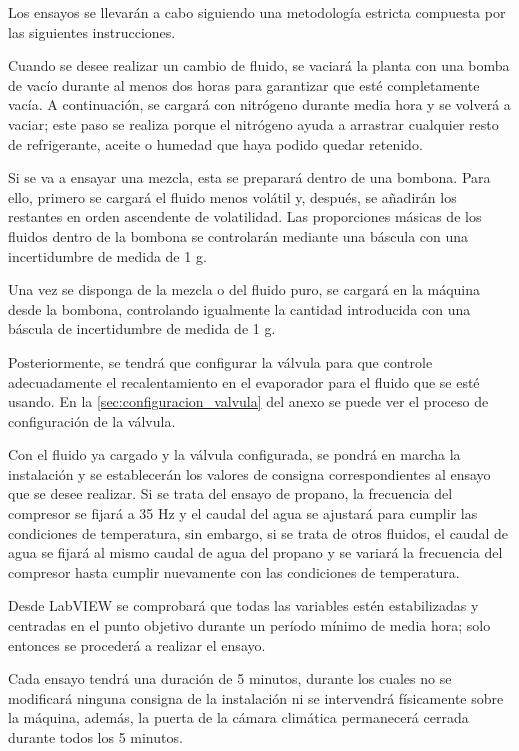 \documentclass[../main.tex]{subfiles}
\begin{document}
Los ensayos se llevarán a cabo siguiendo una metodología estricta compuesta por las siguientes instrucciones.

Cuando se desee realizar un cambio de fluido, se vaciará la planta con una bomba de vacío durante al menos dos horas para garantizar que esté completamente vacía. A continuación, se cargará con nitrógeno durante media hora y se volverá a vaciar; este paso se realiza porque el nitrógeno ayuda a arrastrar cualquier resto de refrigerante, aceite o humedad que haya podido quedar retenido.

Si se va a ensayar una mezcla, esta se preparará dentro de una bombona. Para ello, primero se cargará el fluido menos volátil y, después, se añadirán los restantes en orden ascendente de volatilidad. Las proporciones másicas de los fluidos dentro de la bombona se controlarán mediante una báscula con una incertidumbre de medida de 1 g.

Una vez se disponga de la mezcla o del fluido puro, se cargará en la máquina desde la bombona, controlando igualmente la cantidad introducida con una báscula de incertidumbre de medida de 1 g.

Posteriormente, se tendrá que configurar la válvula para que controle adecuadamente el recalentamiento en el evaporador para el fluido que se esté usando. En la \autoref{sec:configuracion_valvula} del anexo se puede ver el proceso de configuración de la válvula.

Con el fluido ya cargado y la válvula configurada, se pondrá en marcha la instalación y se establecerán los valores de consigna correspondientes al ensayo que se desee realizar. Si se trata del ensayo de propano, la frecuencia del compresor se fijará a 35 Hz y el caudal del agua se ajustará para cumplir las condiciones de temperatura, sin embargo, si se trata de otros fluidos, el caudal de agua se fijará al mismo caudal de agua del propano y se variará la frecuencia del compresor hasta cumplir nuevamente con las condiciones de temperatura.

Desde LabVIEW se comprobará que todas las variables estén estabilizadas y centradas en el punto objetivo durante un período mínimo de media hora; solo entonces se procederá a realizar el ensayo.

Cada ensayo tendrá una duración de 5 minutos, durante los cuales no se modificará ninguna consigna de la instalación ni se intervendrá físicamente sobre la máquina, además, la puerta de la cámara climática permanecerá cerrada durante todos los 5 minutos.
\end{document}

